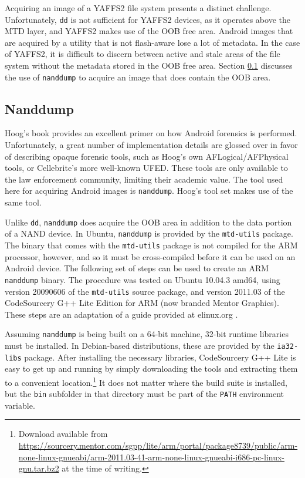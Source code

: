 Acquiring an image of a YAFFS2 file system presents a distinct challenge.  
Unfortunately, \texttt{dd} is not sufficient for YAFFS2 devices, as it operates above the MTD layer, and YAFFS2
makes use of the OOB free area. Android images that are acquired by a utility that is not flash-aware lose a lot of metadata. In the
case of YAFFS2, it is difficult to discern between active and stale areas of the file system without the metadata stored in
the OOB free area. Section \ref{sec:nanddump} discusses the use of \texttt{nanddump} to acquire an image that does contain the OOB
area.

\subsection{Nanddump}
\label{sec:nanddump}
Hoog's book \cite{hoog} provides an excellent primer on how Android forensics is performed.  Unfortunately, a great number of
implementation details are glossed over in favor of describing opaque forensic tools, such as Hoog's own AFLogical/AFPhysical tools,
or Cellebrite's more well-known UFED. These tools are only available to the law enforcement community, limiting their academic
value. The tool used here for acquiring Android images is \texttt{nanddump}. Hoog's tool set makes use of the same tool.

Unlike \texttt{dd}, \texttt{nanddump} does acquire the OOB area in addition to the data portion of a NAND device.  In Ubuntu,
\texttt{nanddump} is provided by the \texttt{mtd-utils} package.  The binary that comes with the \texttt{mtd-utils} package is not
compiled for the ARM processor, however, and so it must be cross-compiled before it can be used on an Android device.  The following
set of steps can be used to create an ARM \texttt{nanddump} binary.  The procedure was tested on Ubuntu 10.04.3 amd64, using version
20090606 of the \texttt{mtd-utils} source package, and version 2011.03 of the CodeSourcery G++ Lite Edition for ARM (now branded
Mentor Graphics).  These steps are an adaptation of a guide provided at elinux.org \cite{compilingmtd}.

Assuming \texttt{nanddump} is being built on a 64-bit machine, 32-bit runtime libraries must be installed.  In Debian-based
distributions, these are provided by the \texttt{ia32-libs} package.  After installing the necessary libraries, CodeSourcery G++ Lite
is easy to get up and running by simply downloading the tools and extracting them to a convenient location.\footnote{Download available
from
\url{https://sourcery.mentor.com/sgpp/lite/arm/portal/package8739/public/arm-none-linux-gnueabi/arm-2011.03-41-arm-none-linux-gnueabi-i686-pc-linux-gnu.tar.bz2}
at the time of writing.} It does not matter where the build suite is installed, but the \texttt{bin} subfolder in that directory
must be part of the \texttt{PATH} environment variable.

